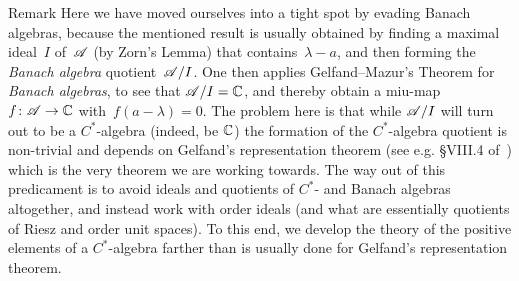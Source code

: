 \documentclass[a]{subfiles}
\begin{document}
\begin{parsec}
\begin{point}{Remark}
Here we have moved ourselves into a tight spot
by evading Banach algebras,
because the mentioned result is usually obtained
by finding a maximal ideal~$I$ of~$\mathscr{A}$
(by Zorn's Lemma) that contains~$\lambda-a$,
and then forming the \emph{Banach algebra} quotient~$\mathscr{A}/I$.
One then applies Gelfand--Mazur's Theorem for \emph{Banach algebras}, 
to see that
$\mathscr{A}/I= \mathbb{C}$,
and thereby obtain a miu-map~$f\colon \mathscr{A}\to \mathbb{C}$ with~$f(a-\lambda)=0$.
The problem here is that while $\mathscr{A}/I$
will turn out to be a $C^*$-algebra (indeed, be $\mathbb{C}$)
the formation of the $C^*$-algebra quotient
is non-trivial and depends on Gelfand's representation theorem
(see e.g. \S{}VIII.4 of~\cite{conway2013}) 
which is the very theorem we are working towards.
The way out of this predicament
is to avoid ideals and quotients of $C^*$- and Banach algebras
altogether,
and instead work 
with order ideals (and what are essentially
 quotients of Riesz and order unit spaces).
To this end,
we develop the theory
of the positive elements of a $C^*$-algebra
farther than is usually done
for Gelfand's representation theorem.
\end{point}
\end{parsec}
\end{document}
